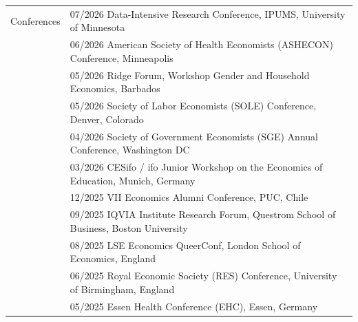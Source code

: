 \documentclass[letterpaper,11pt,oneside]{article}
\begin{document}
\newpage




 \begin{tabular}{@{} l l l}

\Large{Conferences} & \multicolumn{2}{l}{07/2026 \hspace{0.1in} Data-Intensive Research Conference, IPUMS, University of Minnesota}  \\ 
 & \multicolumn{2}{l}{06/2026 \hspace{0.1in} American Society of Health Economists (ASHECON) Conference, Minneapolis}  \\ 
 & \multicolumn{2}{l}{05/2026 \hspace{0.1in} Ridge Forum, Workshop Gender and Household Economics, Barbados}  \\ 
  & \multicolumn{2}{l}{05/2026 \hspace{0.1in} Society of Labor Economists (SOLE) Conference, Denver, Colorado}  \\ 
 & \multicolumn{2}{l}{04/2026 \hspace{0.1in} Society of Government Economists (SGE) Annual Conference, Washington DC}  \\ 
 & \multicolumn{2}{l}{03/2026 \hspace{0.1in} CESifo / ifo Junior Workshop on the Economics of Education, Munich, Germany}  \\ 
 & \multicolumn{2}{l}{12/2025 \hspace{0.1in} VII Economics Alumni Conference, PUC, Chile}  \\ 
  & \multicolumn{2}{l}{09/2025 \hspace{0.1in} IQVIA Institute Research Forum, Questrom School of Business, Boston University}  \\ 
 & \multicolumn{2}{l}{08/2025 \hspace{0.1in} LSE Economics QueerConf, London School of Economics, England}  \\ 
 & \multicolumn{2}{l}{06/2025 \hspace{0.1in} Royal Economic Society (RES) Conference, University of Birmingham, England}  \\ 
 & \multicolumn{2}{l}{05/2025 \hspace{0.1in} Essen Health Conference (EHC), Essen, Germany}  \\ 

\end{tabular}
\end{document}
